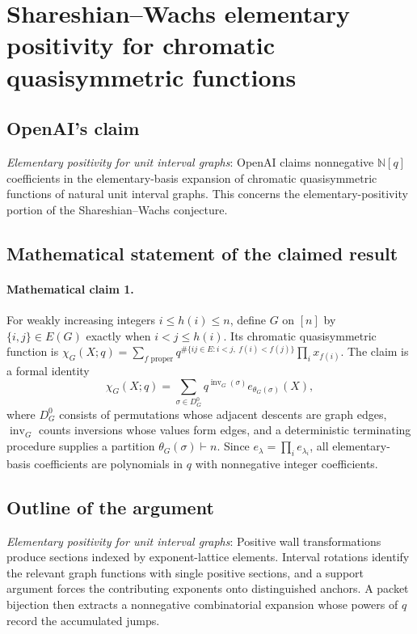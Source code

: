 \documentclass[11pt]{article}
\begin{document}
\section*{Shareshian–Wachs elementary positivity for chromatic quasisymmetric functions}

\subsection{OpenAI's claim}
\textit{Elementary positivity for unit interval graphs}: OpenAI claims nonnegative $\mathbb N[q]$ coefficients in the elementary-basis expansion of chromatic quasisymmetric functions of natural unit interval graphs. This concerns the elementary-positivity portion of the Shareshian--Wachs conjecture.

\subsection{Mathematical statement of the claimed result}
\paragraph{Mathematical claim 1.} For weakly increasing integers $i\le h(i)\le n$, define $G$ on $[n]$ by $\{i,j\}\in E(G)$ exactly when $i<j\le h(i)$. Its chromatic quasisymmetric function is $\chi_G(X;q)=\sum_{f\text{ proper}}q^{\#\{ij\in E:i<j,\ f(i)<f(j)\}}\prod_i x_{f(i)}$. The claim is a formal identity \[\chi_G(X;q)=\sum_{\sigma\in D_G^0}q^{\operatorname{inv}_G(\sigma)}e_{\theta_G(\sigma)}(X),\] where $D_G^0$ consists of permutations whose adjacent descents are graph edges, $\operatorname{inv}_G$ counts inversions whose values form edges, and a deterministic terminating procedure supplies a partition $\theta_G(\sigma)\vdash n$. Since $e_\lambda=\prod_i e_{\lambda_i}$, all elementary-basis coefficients are polynomials in $q$ with nonnegative integer coefficients.

\subsection{Outline of the argument}
\textit{Elementary positivity for unit interval graphs}: Positive wall transformations produce sections indexed by exponent-lattice elements. Interval rotations identify the relevant graph functions with single positive sections, and a support argument forces the contributing exponents onto distinguished anchors. A packet bijection then extracts a nonnegative combinatorial expansion whose powers of $q$ record the accumulated jumps.
\end{document}
